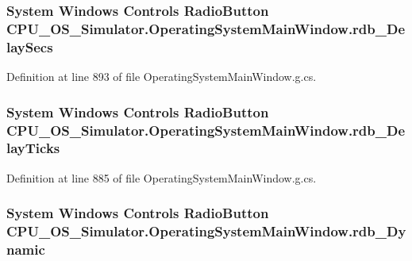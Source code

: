 \subsubsection[{rdb\+\_\+\+Delay\+Secs}]{\setlength{\rightskip}{0pt plus 5cm}System Windows Controls Radio\+Button C\+P\+U\+\_\+\+O\+S\+\_\+\+Simulator.\+Operating\+System\+Main\+Window.\+rdb\+\_\+\+Delay\+Secs\hspace{0.3cm}{\ttfamily [package]}}\label{class_c_p_u___o_s___simulator_1_1_operating_system_main_window_a7b4585b869d26fa4e7d419a064f4f73c}


Definition at line 893 of file Operating\+System\+Main\+Window.\+g.\+cs.

\hypertarget{class_c_p_u___o_s___simulator_1_1_operating_system_main_window_a7b70deef80df6719fc0b7b9c87c268d7}{}
\subsubsection[{rdb\+\_\+\+Delay\+Ticks}]{\setlength{\rightskip}{0pt plus 5cm}System Windows Controls Radio\+Button C\+P\+U\+\_\+\+O\+S\+\_\+\+Simulator.\+Operating\+System\+Main\+Window.\+rdb\+\_\+\+Delay\+Ticks\hspace{0.3cm}{\ttfamily [package]}}\label{class_c_p_u___o_s___simulator_1_1_operating_system_main_window_a7b70deef80df6719fc0b7b9c87c268d7}


Definition at line 885 of file Operating\+System\+Main\+Window.\+g.\+cs.

\hypertarget{class_c_p_u___o_s___simulator_1_1_operating_system_main_window_a9d7779e13ed1b78c4387933df4b40d24}{}
\subsubsection[{rdb\+\_\+\+Dynamic}]{\setlength{\rightskip}{0pt plus 5cm}System Windows Controls Radio\+Button C\+P\+U\+\_\+\+O\+S\+\_\+\+Simulator.\+Operating\+System\+Main\+Window.\+rdb\+\_\+\+Dynamic\hspace{0.3cm}{\ttfamily [package]}}\label{class_c_p_u___o_s___simulator_1_1_operating_system_main_window_a9d7779e13ed1b78c4387933df4b40d24}


